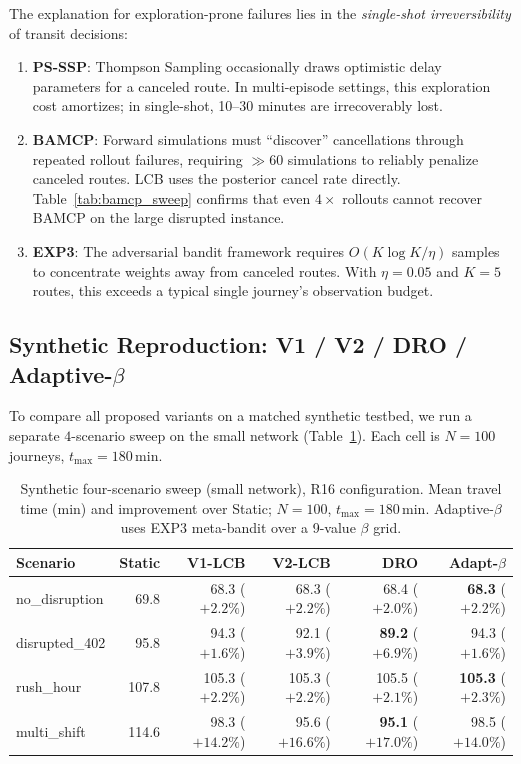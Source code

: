 \documentclass[11pt]{article}
\theoremstyle{definition}
\theoremstyle{remark}
\begin{document}
The explanation for exploration-prone failures lies in the
\emph{single-shot irreversibility} of transit decisions:
\begin{enumerate}
    \item \textbf{PS-SSP}: Thompson Sampling occasionally draws optimistic delay parameters for a canceled route. In multi-episode settings, this exploration cost amortizes; in single-shot, 10--30 minutes are irrecoverably lost.
    \item \textbf{BAMCP}: Forward simulations must ``discover'' cancellations through repeated rollout failures, requiring ${\gg}60$ simulations to reliably penalize canceled routes. LCB uses the posterior cancel rate directly. Table~\ref{tab:bamcp_sweep} confirms that even $4{\times}$ rollouts cannot recover BAMCP on the large disrupted instance.
    \item \textbf{EXP3}: The adversarial bandit framework requires $O(K \log K / \eta)$ samples to concentrate weights away from canceled routes. With $\eta{=}0.05$ and $K{=}5$ routes, this exceeds a typical single journey's observation budget.
\end{enumerate}

\subsection{Synthetic Reproduction: V1 / V2 / DRO / Adaptive-$\beta$}
\label{sec:synth-repro}

To compare all proposed variants on a matched synthetic testbed, we run
a separate $4$-scenario sweep on the small network (Table~\ref{tab:synth_repro}).
Each cell is $N{=}100$ journeys, $t_{\max}{=}180$\,min.

\begin{table}[t]
\centering
\caption{Synthetic four-scenario sweep (small network), R16
configuration. Mean travel time (min) and improvement over Static;
$N{=}100$, $t_{\max}{=}180$\,min. Adaptive-$\beta$ uses EXP3
meta-bandit over a 9-value $\beta$ grid.}
\label{tab:synth_repro}
\begin{tabular}{l rrrrr}
\toprule
Scenario          & Static & V1-LCB & V2-LCB & DRO & Adapt-$\beta$ \\
\midrule
no\_disruption    & 69.8 & 68.3 ($+2.2\%$) & 68.3 ($+2.2\%$) & 68.4 ($+2.0\%$) & \textbf{68.3} ($+2.2\%$) \\
disrupted\_402    & 95.8 & 94.3 ($+1.6\%$) & 92.1 ($+3.9\%$) & \textbf{89.2} ($+6.9\%$) & 94.3 ($+1.6\%$) \\
rush\_hour        & 107.8 & 105.3 ($+2.2\%$) & 105.3 ($+2.2\%$) & 105.5 ($+2.1\%$) & \textbf{105.3} ($+2.3\%$) \\
multi\_shift      & 114.6 & 98.3 ($+14.2\%$) & 95.6 ($+16.6\%$) & \textbf{95.1} ($+17.0\%$) & 98.5 ($+14.0\%$) \\
\bottomrule
\end{tabular}
\end{table}
\end{document}
